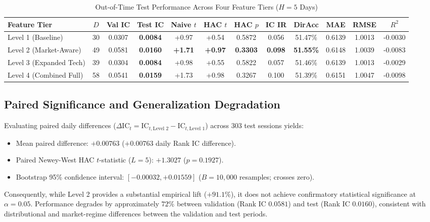 \documentclass[11pt,a4paper]{article}
\begin{document}
\begin{table}[H]
\centering
\small
\caption{Out-of-Time Test Performance Across Four Feature Tiers ($H=5$ Days)}
\label{tab:ablation}
\begin{tabular}{lccccccccccc}
\toprule
\textbf{Feature Tier} & \textbf{$D$} & \textbf{Val IC} & \textbf{Test IC} & \textbf{Naive $t$} & \textbf{HAC $t$} & \textbf{HAC $p$} & \textbf{IC IR} & \textbf{DirAcc} & \textbf{MAE} & \textbf{RMSE} & \textbf{$R^2$} \\
\midrule
Level 1 (Baseline) & 30 & 0.0307 & \textbf{0.0084} & +0.97 & +0.54 & 0.5872 & 0.056 & 51.47\% & 0.6139 & 1.0013 & -0.0030 \\
Level 2 (Market-Aware) & 49 & 0.0581 & \textbf{0.0160} & \textbf{+1.71} & \textbf{+0.97} & \textbf{0.3303} & \textbf{0.098} & \textbf{51.55\%} & 0.6148 & 1.0039 & -0.0083 \\
Level 3 (Expanded Tech) & 39 & 0.0304 & \textbf{0.0084} & +0.98 & +0.55 & 0.5822 & 0.057 & 51.46\% & 0.6139 & 1.0013 & -0.0029 \\
Level 4 (Combined Full) & 58 & 0.0541 & \textbf{0.0159} & +1.73 & +0.98 & 0.3267 & 0.100 & 51.39\% & 0.6151 & 1.0047 & -0.0098 \\
\bottomrule
\end{tabular}
\end{table}

\subsection{Paired Significance and Generalization Degradation}
Evaluating paired daily differences ($\Delta \text{IC}_t = \text{IC}_{t, \text{Level 2}} - \text{IC}_{t, \text{Level 1}}$) across 303 test sessions yields:
\begin{itemize}
    \item Mean paired difference: $+0.00763$ ($+0.00763$ daily Rank IC difference).
    \item Paired Newey-West HAC $t$-statistic ($L=5$): $+1.3027$ ($p = 0.1927$).
    \item Bootstrap 95\% confidence interval: $[-0.00032, +0.01559]$ ($B = 10,000$ resamples; crosses zero).
\end{itemize}
Consequently, while Level 2 provides a substantial empirical lift ($+91.1\%$), it does not achieve confirmatory statistical significance at $\alpha = 0.05$. Performance degrades by approximately $72\%$ between validation (Rank IC $0.0581$) and test (Rank IC $0.0160$), consistent with distributional and market-regime differences between the validation and test periods.
\end{document}
